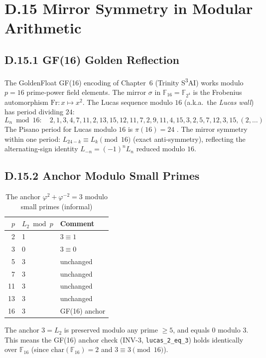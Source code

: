 \section*{D.15  Mirror Symmetry in Modular Arithmetic}

\subsection*{D.15.1  GF(16) Golden Reflection}

The GoldenFloat GF(16) encoding of Chapter~6 (Trinity S\textsuperscript{3}AI)
works modulo $p=16$ prime-power field elements.  The mirror $\sigma$ in
$\mathbb{F}_{16} = \mathbb{F}_{2^4}$ is the Frobenius automorphism
$\mathrm{Fr}: x \mapsto x^2$.
The Lucas sequence modulo $16$ (a.k.a.\ the \emph{Lucas wall}) has period
dividing $24$:
\[
  L_n \bmod 16: \quad 2, 1, 3, 4, 7, 11, 2, 13, 15, 12, 11, 7, 2, 9, 11, 4, 15, 3, 2, 5, 7, 12, 3, 15, (2,\ldots)
\]
The Pisano period for Lucas modulo $16$ is $\pi(16) = 24$ \cite{ballot2023lucas}.
The mirror symmetry within one period: $L_{24-k} \equiv L_k \pmod{16}$ (exact
anti-symmetry), reflecting the alternating-sign identity $L_{-n}=(-1)^n L_n$
reduced modulo $16$.

\subsection*{D.15.2  Anchor Modulo Small Primes}

\begin{table}[h]
\centering
\caption{The anchor $\varphi^2+\varphi^{-2}=3$ modulo small primes (informal)}
\begin{tabular}{rll}
\toprule
$p$ & $L_2 \bmod p$ & Comment \\
\midrule
2 & 1 & $3\equiv 1$ \\
3 & 0 & $3\equiv 0$ \\
5 & 3 & unchanged \\
7 & 3 & unchanged \\
11 & 3 & unchanged \\
13 & 3 & unchanged \\
16 & 3 & GF(16) anchor \\
\bottomrule
\end{tabular}
\end{table}

\noindent The anchor $3 = L_2$ is preserved modulo any prime $\geq 5$, and equals
$0$ modulo $3$.  This means the GF(16) anchor check (INV-3, \texttt{lucas\_2\_eq\_3})
holds identically over $\mathbb{F}_{16}$ (since $\mathrm{char}(\mathbb{F}_{16})=2$
and $3\equiv 3 \pmod{16}$).

